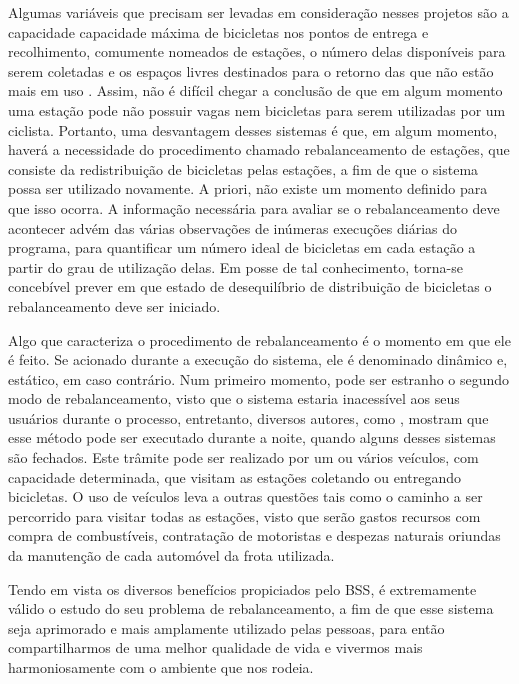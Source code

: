 \par Algumas variáveis que precisam ser levadas em consideração nesses projetos são a capacidade capacidade máxima de bicicletas nos pontos de entrega e recolhimento, comumente nomeados de estações, o número delas disponíveis para serem coletadas e os espaços livres destinados para o retorno das que não estão mais em uso \citet{art:REF_ART_1}. Assim, não é difícil chegar a conclusão de que em algum momento uma estação pode não possuir vagas nem bicicletas para serem utilizadas por um ciclista. Portanto, uma desvantagem desses sistemas é que, em algum momento, haverá a necessidade do procedimento chamado rebalanceamento de estações, que consiste da redistribuição de bicicletas pelas estações, a fim de que o sistema possa ser utilizado novamente. A priori, não existe um momento definido para que isso ocorra. A informação necessária para avaliar se o rebalanceamento deve acontecer advém das várias observações de inúmeras execuções diárias do programa, para quantificar um número ideal de bicicletas em cada estação a partir do grau de utilização delas. Em posse de tal conhecimento, torna-se concebível prever em que estado de desequilíbrio de distribuição de bicicletas o rebalanceamento deve ser iniciado. \par Algo que caracteriza o procedimento de rebalanceamento é o momento em que ele é feito. Se acionado durante a execução do sistema, ele é denominado dinâmico e, estático, em caso contrário. Num primeiro momento, pode ser estranho o segundo modo de rebalanceamento, visto que o sistema estaria inacessível aos seus usuários durante o processo, entretanto, diversos autores, como \citet{art:REF_ART_2}, mostram que esse método pode ser executado durante a noite, quando alguns desses sistemas são fechados. Este trâmite pode ser realizado por um ou vários veículos, com capacidade determinada, que visitam as estações coletando ou entregando bicicletas. O uso de veículos leva a outras questões tais como o caminho a ser percorrido para visitar todas as estações, visto que serão gastos recursos com compra de combustíveis, contratação de motoristas e  despezas naturais oriundas da manutenção de cada automóvel da frota utilizada. \par Tendo em vista os diversos benefícios propiciados pelo BSS, é extremamente válido o estudo do seu problema de rebalanceamento, a fim de que esse sistema seja aprimorado e mais amplamente utilizado pelas pessoas, para então compartilharmos de uma melhor qualidade de vida e vivermos mais harmoniosamente com o ambiente que nos rodeia.

